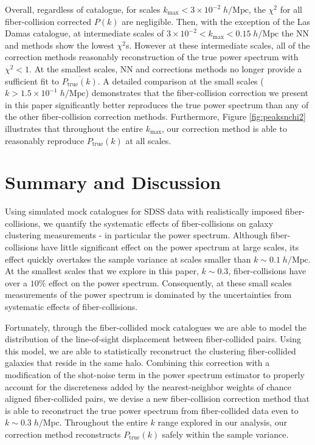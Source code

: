 \documentclass{emulateapj}
\begin{document}
Overall, regardless of catalogue, for scales $k_\mathrm{max} < 3 \times 10^{-2} \;h/\mathrm{Mpc}$, the $\chi^2$ for all fiber-collision corrected $P(k)$ are negligible. Then, with the exception of the Las Damas catalogue, at intermediate scales of $3 \times 10^{-2} < k_\mathrm{max} < 0.15 \; h/\mathrm{Mpc}$ the NN and \cite{Beutler:2014aa} methods show the lowest $\chi^2$s. However at these intermediate scales, all of the correction methods reasonably reconstruction of the true power spectrum with $\chi^2 < 1$. At the smallest scales, NN and \cite{Beutler:2014aa} corrections methods no longer provide a sufficient fit to $\overline{P_\mathrm{true}(k)}$. A detailed comparison at the small scales ($k > 1.5 \times 10^{-1} \;h/\mathrm{Mpc}$) demonstrates that the fiber-collision correction we present in this paper significantly better reproduces the true power spectrum than any of the other fiber-collision correction methods. Furthermore, Figure \ref{fig:peaksnchi2} illustrates that throughout the entire $k_\mathrm{max}$, our correction method is able to reasonably reproduce $P_\mathrm{true}(k)$ at all scales. 

\section{Summary and Discussion} \label{sec:summary}
Using simulated mock catalogues for SDSS data with realistically imposed fiber-collisions, we quantify the systematic effects of fiber-collisions on galaxy clustering measurements - in particular the power spectrum. Although fiber-collisions have little significant effect on the power spectrum at large scales, its effect quickly overtakes the sample variance at scales smaller than $k \sim 0.1 \;h/\mathrm{Mpc}$. At the smallest scales that we explore in this paper, $k \sim 0.3$, fiber-collisions have over a $10 \%$ effect on the power spectrum. Consequently, at these small scales measurements of the power spectrum is dominated by the uncertainties from systematic effects of fiber-collisions. 

Fortunately, through the fiber-collided mock catalogues we are able to model the distribution of the line-of-sight displacement between fiber-collided pairs. Using this model, we are able to statistically reconstruct the clustering fiber-collided galaxies that reside in the same halo. Combining this correction with a modification of the shot-noise term in the power spectrum estimator to properly account for the discreteness added by the nearest-neighbor weights of chance aligned fiber-collided pairs, we devise a new fiber-collision correction method that is able to reconstruct the true power spectrum from fiber-collided data even to $k \sim 0.3 \;h/\mathrm{Mpc}$. Throughout the entire $k$ range explored in our analysis, our correction method reconstructs $P_\mathrm{true}(k)$ safely within the sample variance. 
\end{document}
